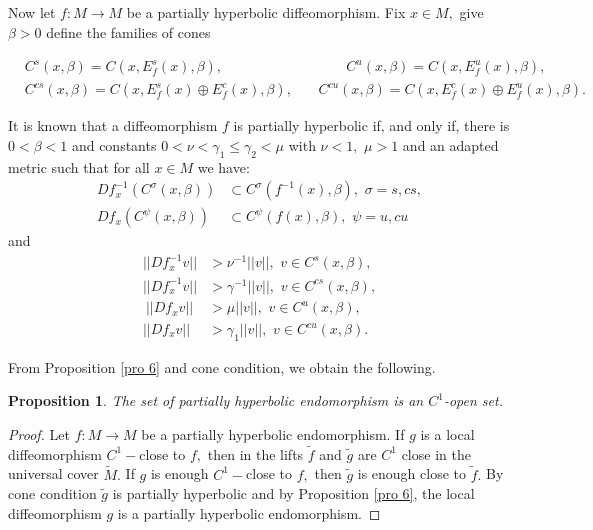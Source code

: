 \documentclass[12pt,reqno]{amsart}
\numberwithin{equation}{section}
\theoremstyle{plain}
\newtheorem{proposition}[theorem]{Proposition}
\theoremstyle{remark}
\begin{document}
Now let $f:M\rightarrow M$ be a partially hyperbolic diffeomorphism. Fix $x\in M,$ give $\beta>0$ define the families of cones

\begin{align*}
&C^s(x,\beta)=C(x,E^s_f(x), \beta),\,\,\,\,\,\,\,\,\,\,\hspace{3cm} C^u(x,\beta)=  C(x,E^u_f(x), \beta),\\
&C^{cs}(x,\beta)= C(x,E^{s}_f(x)\oplus E^c_f(x), \beta),\,\,\,\,\,\,\,\,\,\,\, C^{cu}(x,\beta)= C(x,E^{c}_f(x)\oplus E^{u}_f(x), \beta).
\end{align*}

It is known that a diffeomorphism $f$ is  partially hyperbolic if, and only if, there is $0<\beta<1$ and constants
\mbox{$0<\nu<\gamma_1\leq\gamma_2<\mu$} with $\nu<1,$ $\mu>1$ and an adapted metric such that for all $x \in M$ we have:
\begin{align*}
Df^{-1}_x(C^{\sigma}(x,\beta))&\subset C^{\sigma}(f^{-1}(x),\beta),\,\, \sigma=s,cs, \nonumber\\
Df_x(C^{\psi}(x,\beta))&\subset C^{\psi}(f(x),\beta),\,\, \psi=u,cu \nonumber
\end{align*}
and
\begin{align*}\label{eq C2}
||Df^{-1}_x v||&>\nu^{-1}||v||,\,\, v\in C^s(x,\beta), \\
||Df^{-1}_x v||&>\gamma^{-1}||v||,\,\, v\in C^{cs}(x,\beta), \\\
||Df_x v||&>\mu||v||,\,\, v\in C^{u}(x,\beta), \\
||Df_x v||&>\gamma_1||v||,\,\, v\in C^{cu}(x,\beta).
\end{align*}



From Proposition \ref{pro 6} and cone condition, we obtain the following.

\begin{proposition}
The set of partially hyperbolic endomorphism is an $C^1$-open set.
\end{proposition}



\begin{proof} Let $f: M \rightarrow M$ be a partially hyperbolic endomorphism. If $g$ is a local diffeomorphism $C^1-$close to $f,$ then in the lifts $\widetilde{f}$ and $\widetilde{g}$ are $C^1$ close in the universal cover $\widetilde{M}.$ If $g$ is enough $C^1-$close to $f,$ then $\widetilde{g}$ is enough close to $\widetilde{f}.$ By cone condition $\widetilde{g}$ is partially hyperbolic and by Proposition \ref{pro 6}, the local diffeomorphism $g$ is a partially hyperbolic endomorphism.



\end{proof}
\end{document}
